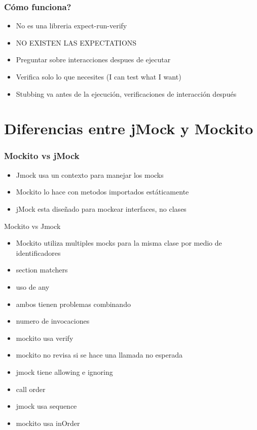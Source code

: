 \documentclass[]{beamer}
\begin{document}
\begin{frame}[c]
  \frametitle{Cómo funciona?}
  \begin{itemize}
  \pause \item \alert{No es una libreria expect-run-verify}
  \pause \item \alert{NO EXISTEN LAS EXPECTATIONS}
  \pause \item Preguntar sobre interacciones despues de ejecutar
  \pause \item Verifica solo lo que necesites (I can test what I want)
  \pause \item Stubbing va antes de la ejecución, verificaciones de interacción después
  \end{itemize}
\end{frame}

\section{Diferencias entre jMock y Mockito}
\begin{frame}
\frametitle{Mockito vs jMock}
  \begin{itemize}
  \item Jmock usa un contexto para manejar los mocks
  \item Mockito lo hace con metodos importados estáticamente
  \item jMock esta diseñado para mockear interfaces, no clases
  \end{itemize}
\end{frame}

\begin{frame}{Mockito vs Jmock}
  \begin{itemize}
  \item Mockito utiliza multiples mocks para la misma clase por medio de identificadores
    \item section matchers
    \item uso de any
    \item ambos tienen problemas combinando
  \item numero de invocaciones
    \item mockito usa verify
    \item mockito no revisa si se hace una llamada no esperada
    \item jmock tiene allowing e ignoring
  \item call order
  \item jmock usa sequence
    \item mockito usa inOrder
  \end{itemize}

\end{frame}
\end{document}
